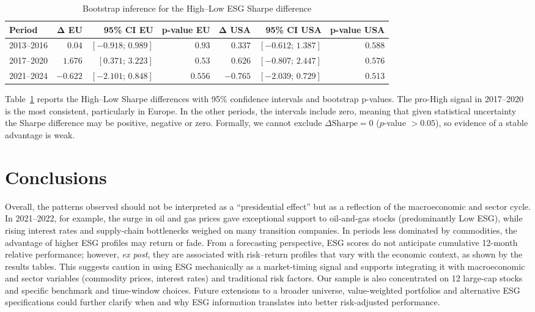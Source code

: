 \documentclass[12pt,a4paper]{article}
\begin{document}
\begin{table}[H]
\centering
\caption{Bootstrap inference for the High--Low ESG Sharpe difference}
\label{tab:bootstrap}
\footnotesize
\setlength{\tabcolsep}{3pt}
\begin{tabular}{lrrrrrr}
\toprule
\textbf{Period} & $\boldsymbol{\Delta}$\textbf{ EU} & \textbf{95\% CI EU} & \textbf{p-value EU} & $\boldsymbol{\Delta}$\textbf{ USA} & \textbf{95\% CI USA} & \textbf{p-value USA} \\
\midrule
2013--2016 & $0.04$ & $[-0.918;\,0.989]$ & $0.93$ & $0.337$ & $[-0.612;\,1.387]$ & $0.588$ \\
2017--2020 & $1.676$ & $[0.371;\,3.223]$ & $0.53$ & $0.626$ & $[-0.807;\,2.447]$ & $0.576$ \\
2021--2024 & $-0.622$ & $[-2.101;\,0.848]$ & $0.556$ & $-0.765$ & $[-2.039;\,0.729]$ & $0.513$ \\
\bottomrule
\end{tabular}
\end{table}

Table~\ref{tab:bootstrap} reports the High--Low Sharpe differences with 95\% confidence intervals and bootstrap p-values. The pro-High signal in 2017--2020 is the most consistent, particularly in Europe. In the other periods, the intervals include zero, meaning that given statistical uncertainty the Sharpe difference may be positive, negative or zero. Formally, we cannot exclude $\Delta\mathrm{Sharpe}=0$ ($p$-value $>0.05$), so evidence of a stable advantage is weak.

\section*{Conclusions}

Overall, the patterns observed should not be interpreted as a ``presidential effect'' but as a reflection of the macroeconomic and sector cycle. In 2021--2022, for example, the surge in oil and gas prices gave exceptional support to oil-and-gas stocks (predominantly Low ESG), while rising interest rates and supply-chain bottlenecks weighed on many transition companies. In periods less dominated by commodities, the advantage of higher ESG profiles may return or fade. From a forecasting perspective, ESG scores do not anticipate cumulative 12-month relative performance; however, \textit{ex post}, they are associated with risk--return profiles that vary with the economic context, as shown by the results tables. This suggests caution in using ESG mechanically as a market-timing signal and supports integrating it with macroeconomic and sector variables (commodity prices, interest rates) and traditional risk factors. Our sample is also concentrated on 12 large-cap stocks and specific benchmark and time-window choices. Future extensions to a broader universe, value-weighted portfolios and alternative ESG specifications could further clarify when and why ESG information translates into better risk-adjusted performance.
\end{document}
